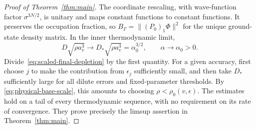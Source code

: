 \begin{proof}[Proof of Theorem~\ref{thm:main}]
The coordinate rescaling, with wave-function factor $\sigma^{3N/2}$,
is unitary and maps constant functions to constant functions. It preserves
the occupation fraction, so
$B_\Gamma=\|(P_0)_1\Phi\|^2$ for the unique ground-state density matrix.
In the inner thermodynamic limit,
\[
 D\sqrt{\rho a_v^3}\longrightarrow
 D_*\sqrt{\rho a_v^3}=\alpha_0^{3/2},\qquad
 \alpha\longrightarrow\alpha_0>0.
\]
Divide~\eqref{eq:scaled-final-depletion} by the first quantity. For a
given accuracy, first choose $j$ to make the contribution from
$\epsilon_j$ sufficiently small, and then take $D_*$ sufficiently large
for all dilute errors and fixed-parameter thresholds. By
\eqref{eq:physical-base-scale}, this amounts to choosing
$\rho<\rho_0(v,\epsilon)$. The estimates hold on a tail of every
thermodynamic sequence, with no requirement on its rate of convergence.
They prove precisely the limsup assertion in Theorem~\ref{thm:main}.
\end{proof}
